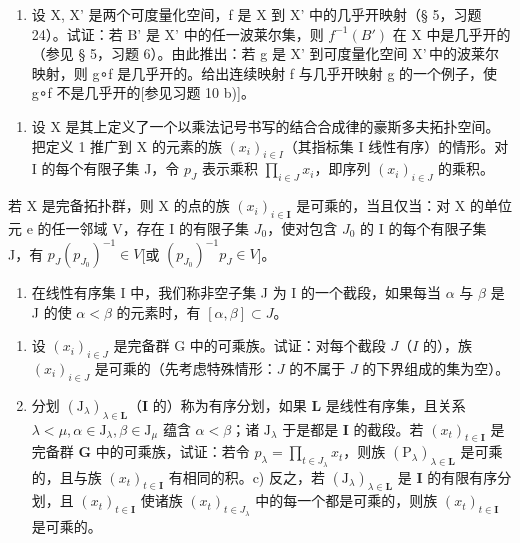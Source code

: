 \begin{enumerate}
\def\labelenumi{\arabic{enumi})}
\setcounter{enumi}{18}
\tightlist
\item
  设 X, X' 是两个可度量化空间，f 是 X 到 X' 中的几乎开映射（§ 5，习题 24）。试证：若 B' 是 X' 中的任一波莱尔集，则 \(f^{-1}(B')\) 在 X 中是几乎开的（参见 § 5，习题 6）。由此推出：若 g 是 X' 到可度量化空间 X'\,中的波莱尔映射，则 g∘f 是几乎开的。给出连续映射 f 与几乎开映射 g 的一个例子，使 g∘f 不是几乎开的{[}参见习题 10 b){]}。
\end{enumerate}

\ExerciseAppendix

\begin{enumerate}
\def\labelenumi{\arabic{enumi})}
\tightlist
\item
  设 X 是其上定义了一个以乘法记号书写的结合合成律的豪斯多夫拓扑空间。把定义 1 推广到 X 的元素的族 \((x_{i})_{i\in I}\)（其指标集 I 线性有序）的情形。对 I 的每个有限子集 J，令 \(p_{J}\) 表示乘积 \(\prod_{i\in J} x_{i}\)，即序列 \((x_{i})_{i\in J}\) 的乘积。
\end{enumerate}

若 X 是完备拓扑群，则 X 的点的族 \((x_{i})_{i\in\mathbf{I}}\) 是可乘的，当且仅当：对 X 的单位元 e 的任一邻域 V，存在 I 的有限子集 \(J_{0}\)，使对包含 \(J_{0}\) 的 I 的每个有限子集 J，有 \(p_{J}(p_{J_{0}})^{-1}\in V\){[}或 \((p_{J_{0}})^{-1}p_{J}\in V\){]}。

\begin{enumerate}
\def\labelenumi{\arabic{enumi})}
\setcounter{enumi}{1}
\tightlist
\item
  在线性有序集 I 中，我们称非空子集 J 为 I 的一个截段，如果每当 \(\alpha\) 与 \(\beta\) 是 J 的使 \(\alpha < \beta\) 的元素时，有 \([\alpha, \beta] \subset J\)。
\end{enumerate}

\begin{enumerate}
\def\labelenumi{\alph{enumi})}
\item
  设 \((x_{i})_{i\in J}\) 是完备群 G 中的可乘族。试证：对每个截段 \(J\)（\(I\) 的），族 \((x_{i})_{i\in J}\) 是可乘的（先考虑特殊情形：\(J\) 的不属于 \(J\) 的下界组成的集为空）。
\item
  分划 \((\mathrm{J}_{\lambda})_{\lambda \in \mathbf{L}}\)（\(\mathbf{I}\) 的）称为有序分划，如果 \(\mathbf{L}\) 是线性有序集，且关系 \(\lambda < \mu, \alpha \in \mathrm{J}_{\lambda}, \beta \in \mathrm{J}_{\mu}\) 蕴含 \(\alpha < \beta\)；诸 \(\mathrm{J}_{\lambda}\) 于是都是 \(\mathbf{I}\) 的截段。若 \((x_{t})_{t \in \mathbf{I}}\) 是完备群 \(\mathbf{G}\) 中的可乘族，试证：若令 \(p_{\lambda} = \prod_{t \in J_{\lambda}} x_{t}\)，则族 \((\mathrm{P}_{\lambda})_{\lambda \in \mathbf{L}}\) 是可乘的，且与族 \((x_{t})_{t \in \mathbf{I}}\) 有相同的积。c) 反之，若 \((\mathrm{J}_{\lambda})_{\lambda \in \mathbf{L}}\) 是 \(\mathbf{I}\) 的有限有序分划，且 \((x_{t})_{t \in \mathbf{I}}\) 使诸族 \((x_{t})_{t \in J_{\lambda}}\) 中的每一个都是可乘的，则族 \((x_{t})_{t \in \mathbf{I}}\) 是可乘的。
\end{enumerate}

